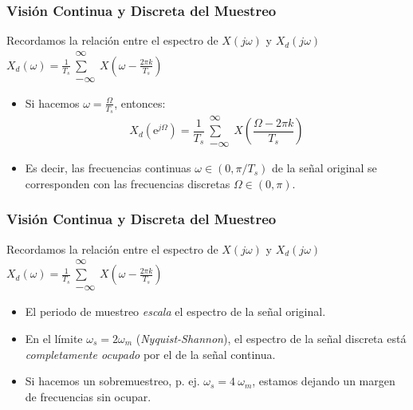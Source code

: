 \documentclass[handout]{beamer}
\numberwithin{section}{part}
\begin{document}
  \begin{frame}
  \frametitle{Visión Continua y Discreta del Muestreo}
      \begin{alertblock}{Recordamos la relación entre el espectro de $X(j\omega)$ y $X_d(j\omega)$}
        \centering
        $X_d(\omega)=\frac{1}{T_s} \substack{\infty \\ \sum \\ -\infty} X(\omega - \frac{2\pi k}{T_s})$
      \end{alertblock}
      
      \begin{itemize}
        \item Si hacemos $\omega=\frac{\Omega}{T_s}$, entonces:
        \[
        X_d(\mathrm{e}^{j\Omega})= \frac{1}{T_s} \substack{\infty \\ \sum \\ -\infty} X(\frac{\Omega - 2\pi k}{T_s})
        \]
        \item Es decir, las frecuencias continuas $\omega\in(0, \pi/T_s)$ de la señal original se corresponden con las frecuencias discretas $\Omega\in(0, \pi)$.        
    \end{itemize}    
  \end{frame}

  \begin{frame}
  \frametitle{Visión Continua y Discreta del Muestreo}
      \begin{alertblock}{Recordamos la relación entre el espectro de $X(j\omega)$ y $X_d(j\omega)$}
        \centering
        $X_d(\omega)=\frac{1}{T_s} \substack{\infty \\ \sum \\ -\infty} X(\omega - \frac{2\pi k}{T_s})$
      \end{alertblock}
      
      \begin{itemize}
        \item El periodo de muestreo \emph{escala} el espectro de la señal original.
        \item En el límite $\omega_s=2\omega_m$ (\emph{Nyquist-Shannon}), el espectro de la señal discreta está \emph{completamente ocupado} por el de la señal continua.
        \item Si hacemos un sobremuestreo, p. ej. $\omega_s=4\:\omega_m$, estamos dejando un margen de frecuencias sin ocupar. 
    \end{itemize}    
  \end{frame}
\end{document}
